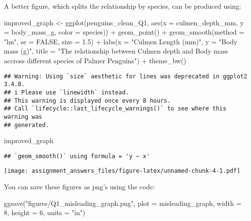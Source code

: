 \documentclass[
]{article}
\newenvironment{Shaded}{\begin{snugshade}}{\end{snugshade}}
\newcommand{\AttributeTok}[1]{\textcolor[rgb]{0.77,0.63,0.00}{#1}}
\newcommand{\ConstantTok}[1]{\textcolor[rgb]{0.00,0.00,0.00}{#1}}
\newcommand{\DecValTok}[1]{\textcolor[rgb]{0.00,0.00,0.81}{#1}}
\newcommand{\FloatTok}[1]{\textcolor[rgb]{0.00,0.00,0.81}{#1}}
\newcommand{\FunctionTok}[1]{\textcolor[rgb]{0.00,0.00,0.00}{#1}}
\newcommand{\NormalTok}[1]{#1}
\newcommand{\OtherTok}[1]{\textcolor[rgb]{0.56,0.35,0.01}{#1}}
\newcommand{\SpecialCharTok}[1]{\textcolor[rgb]{0.00,0.00,0.00}{#1}}
\newcommand{\StringTok}[1]{\textcolor[rgb]{0.31,0.60,0.02}{#1}}
\begin{document}
A better figure, which splits the relationship by species, can be
produced using:

\begin{Shaded}
\begin{Highlighting}[]
\NormalTok{improved\_graph }\OtherTok{\textless{}{-}} \FunctionTok{ggplot}\NormalTok{(penguins\_clean\_Q1, }\FunctionTok{aes}\NormalTok{(}\AttributeTok{x =}\NormalTok{ culmen\_depth\_mm, }\AttributeTok{y =}\NormalTok{ body\_mass\_g, }\AttributeTok{color =}\NormalTok{ species)) }\SpecialCharTok{+}
  \FunctionTok{geom\_point}\NormalTok{() }\SpecialCharTok{+}
  \FunctionTok{geom\_smooth}\NormalTok{(}\AttributeTok{method =} \StringTok{"lm"}\NormalTok{, }\AttributeTok{se =} \ConstantTok{FALSE}\NormalTok{, }\AttributeTok{size =} \FloatTok{1.5}\NormalTok{) }\SpecialCharTok{+}
  \FunctionTok{labs}\NormalTok{(}\AttributeTok{x =} \StringTok{"Culmen Length (mm)"}\NormalTok{, }\AttributeTok{y =} \StringTok{"Body mass (g)"}\NormalTok{, }\AttributeTok{title =} \StringTok{"The relationship between Culmen depth and Body mass }
\StringTok{       accross different species of Palmer Penguins"}\NormalTok{) }\SpecialCharTok{+}
  \FunctionTok{theme\_bw}\NormalTok{()}
\end{Highlighting}
\end{Shaded}

\begin{verbatim}
## Warning: Using `size` aesthetic for lines was deprecated in ggplot2 3.4.0.
## i Please use `linewidth` instead.
## This warning is displayed once every 8 hours.
## Call `lifecycle::last_lifecycle_warnings()` to see where this warning was
## generated.
\end{verbatim}

\begin{Shaded}
\begin{Highlighting}[]
\NormalTok{improved\_graph}
\end{Highlighting}
\end{Shaded}

\begin{verbatim}
## `geom_smooth()` using formula = 'y ~ x'
\end{verbatim}

\texttt{[image: assignment\_answers\_files/figure-latex/unnamed-chunk-4-1.pdf]}

You can save these figures as png's using the code:

\begin{Shaded}
\begin{Highlighting}[]
\FunctionTok{ggsave}\NormalTok{(}\StringTok{"figures/Q1\_misleading\_graph.png"}\NormalTok{, }\AttributeTok{plot =}\NormalTok{ misleading\_graph, }\AttributeTok{width =} \DecValTok{8}\NormalTok{, }\AttributeTok{height =} \DecValTok{6}\NormalTok{, }\AttributeTok{units =} \StringTok{"in"}\NormalTok{)}
\end{Highlighting}
\end{Shaded}
\end{document}
